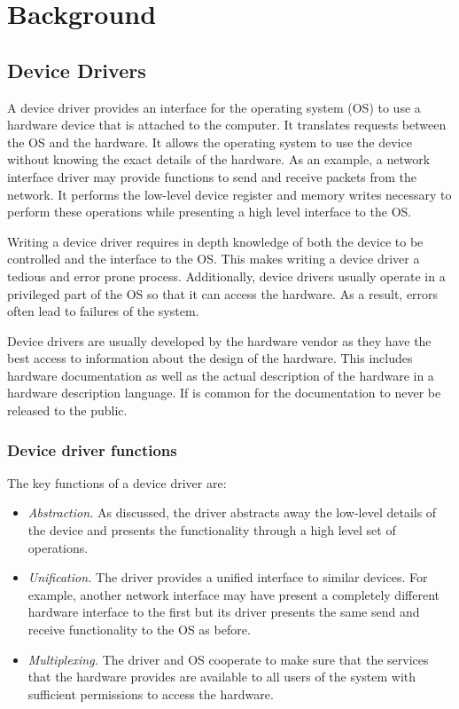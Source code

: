 \chapter{Background}
\label{ch:background}

\section{Device Drivers}

A device driver provides an interface for the operating system (OS) to use a hardware device that is attached to the computer. It translates requests between the OS and the hardware. It allows the operating system to use the device without knowing the exact details of the hardware. As an example, a network interface driver may provide functions to send and receive packets from the network. It performs the low-level device register and memory writes necessary to perform these operations while presenting a high level interface to the OS.

Writing a device driver requires in depth knowledge of both the device to be controlled and the interface to the OS. This makes writing a device driver a tedious and error prone process. Additionally, device drivers usually operate in a privileged part of the OS so that it can access the hardware. As a result, errors often lead to failures of the system.

Device drivers are usually developed by the hardware vendor as they have the best access to information about the design of the hardware. This includes hardware documentation as well as the actual description of the hardware in a hardware description language. If is common for the documentation to never be released to the public.

\subsection{Device driver functions}

The key functions of a device driver are:
\begin{itemize}
    \item \emph{Abstraction.} As discussed, the driver abstracts away the low-level details of the device and presents the functionality through a high level set of operations.
    \item \emph{Unification.} The driver provides a unified interface to similar devices. For example, another network interface may have present a completely different hardware interface to the first but its driver presents the same send and receive functionality to the OS as before. 
    \item \emph{Multiplexing.} The driver and OS cooperate to make sure that the services that the hardware provides are available to all users of the system with sufficient permissions to access the hardware.
\end{itemize}

